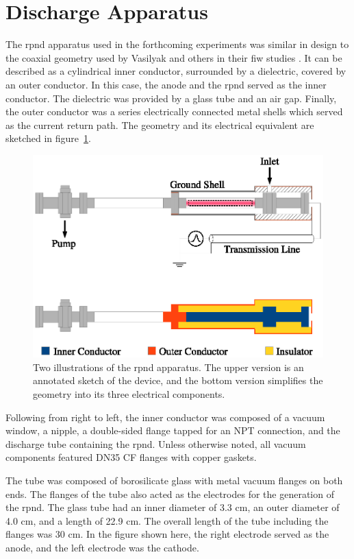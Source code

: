 \section{Discharge Apparatus}

The \acs{rpnd} apparatus used in the forthcoming experiments was similar in
design to the coaxial geometry used by Vasilyak and others in their \acs{fiw}
studies \cite{Vasilyak1994}. It can be described as a cylindrical inner
conductor, surrounded by a dielectric, covered by an outer conductor. In this
case, the anode and the \acs{rpnd} served as the inner conductor. The dielectric
was provided by a glass tube and an air gap. Finally, the outer conductor was a
series electrically connected metal shells which served as the current return
path. The geometry and its electrical equivalent are sketched in
figure~\ref{fig:appschem}.
\begin{figure}
  \centering
  \includegraphics{./chapters/experiment/figures/appschem.eps}
  \caption{Two illustrations of the \acs{rpnd} apparatus. The upper version is
    an annotated sketch of the device, and the bottom version simplifies the
    geometry into its three electrical components.}
  \label{fig:appschem}
\end{figure}
Following from right to left, the inner conductor was composed of a vacuum
window, a nipple, a double-sided flange tapped for an NPT connection, and the
discharge tube containing the \acs{rpnd}. Unless otherwise noted, all vacuum
components featured DN35 CF flanges with copper gaskets.

The tube was composed of borosilicate glass with metal vacuum flanges on both
ends. The flanges of the tube also acted as the electrodes for the generation of
the \acs{rpnd}. The glass tube had an inner diameter of 3.3 cm, an outer
diameter of 4.0 cm, and a length of 22.9 cm. The overall length of the tube
including the flanges was 30 cm. In the figure shown here, the right electrode
served as the anode, and the left electrode was the cathode.

